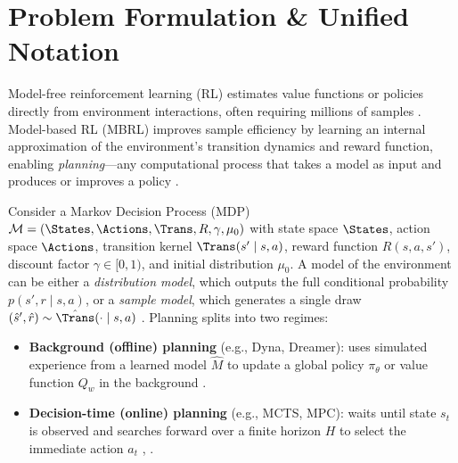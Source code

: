 \documentclass[../../../../master.tex]{subfiles}
\begin{document}

\section{Problem Formulation \& Unified Notation}
\label{sec:mbrl:formulation}

Model-free reinforcement learning (RL) estimates value functions or policies directly from environment interactions, often requiring millions of samples \newline {}. Model-based RL (MBRL) improves sample efficiency by learning an internal approximation of the environment's transition dynamics and reward function, enabling \emph{planning}---any computational process that takes a model as input and produces or improves a policy \newline {}.

Consider a Markov Decision Process (MDP) $\mathcal{M} = (\States, \Actions, \Trans, R, \gamma, \mu_0)$ with state space $\States$, action space $\Actions$, transition kernel $\Trans(s' \mid s, a)$, reward function $R(s, a, s')$, discount factor $\gamma \in [0, 1)$, and initial distribution $\mu_0$. A model of the environment can be either a \emph{distribution model}, which outputs the full conditional probability $p(s', r \mid s, a)$, or a \emph{sample model}, which generates a single draw $(\hat{s}', \hat{r}) \sim \hat{\Trans}(\cdot \mid s, a)$ . Planning splits into two regimes:
\begin{itemize}
  \item \textbf{Background (offline) planning} (e.g., Dyna, Dreamer): uses simulated experience from a learned model $\hat{M}$ to update a global policy $\pi_\theta$ or value function $Q_w$ in the background .
  \item \textbf{Decision-time (online) planning} (e.g., MCTS, MPC): waits until state $s_t$ is observed and searches forward over a finite horizon $H$ to select the immediate action $a_t$ \newline {}, \newline {}.
\end{itemize}
\end{document}
